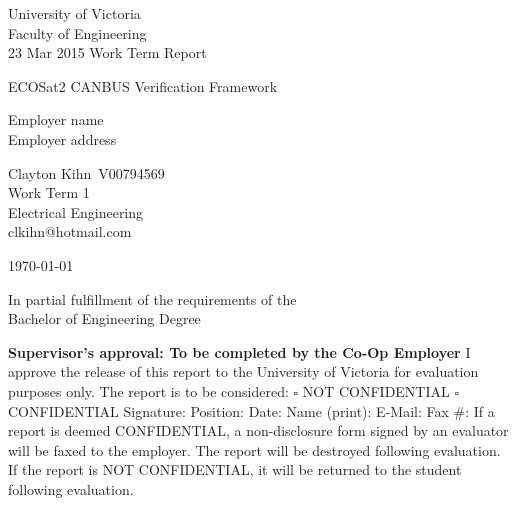 \documentclass[11pt]{article}
\providecommand{\blankline}{\underline{\hspace{3cm}}}
\newenvironment{ApprovalBox}
	{ %
		\begin{framed}			
		\begin{scriptsize}
		\begin{flushleft}
		\begin{small}
	}
	{ %
		\end{small}
		\end{flushleft}
		\end{scriptsize}
		\end{framed}
	}
\begin{document}
\begin{center}
University of Victoria\\
Faculty of Engineering\\
23 Mar 2015 Work Term Report\\
\vspace{1cm}

{\huge ECOSat2 CANBUS Verification Framework}\\
\vspace{1cm}

Employer name \\
Employer address\\
\vspace{1cm}

Clayton Kihn\
V00794569\\
Work Term 1\\
Electrical Engineering\\
clkihn@hotmail.com\\
\vspace{0.5cm}

\today \\
\vspace{1cm}

In partial fulfillment of the requirements of the\\
Bachelor of Engineering Degree\\
\vspace{4cm}



\begin{ApprovalBox}
	\textbf{Supervisor's approval: To be completed by the Co-Op Employer} 
	\newline\newline
	I approve the release of this report to the University of Victoria for evaluation purposes only. 
	\newline\newline
	The report is to be considered: \quad $\square${} NOT CONFIDENTIAL \quad $\square${} CONFIDENTIAL
	\newline\newline
	Signature: \blankline{} Position: \blankline{} Date: \blankline{} \newline\newline
	Name (print): \blankline{} E-Mail: \blankline{} Fax \#: \blankline{} 
	\newline\newline
	If a report is deemed CONFIDENTIAL, a non-disclosure form signed by an evaluator will be faxed to the employer. The report will be destroyed following evaluation. If the report is NOT CONFIDENTIAL, it will be returned to the student following evaluation.
\end{ApprovalBox}

\end{center}
\restoregeometry		%
\end{document}
